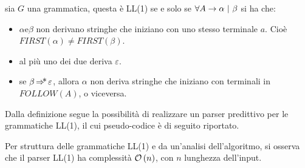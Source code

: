 \documentclass{subfiles}
\begin{document}
\begin{Definition*}
    sia $G$ una grammatica, questa è LL(1) se e solo se $\forall \Grammar{A}{\alpha}[\beta]$ si ha che:
    \begin{itemize}
        \item $\alpha \text{e} \beta$ non derivano stringhe che iniziano con uno stesso terminale $a$.
              Cioè $FIRST(\alpha) \neq FIRST(\beta)$.
        \item al più uno dei due deriva $\varepsilon$.
        \item se $\beta \operatorname{\Rightarrow\hspace{-5pt}*} \varepsilon$, allora $\alpha$ non deriva stringhe che iniziano con terminali in $FOLLOW(A)$, o viceversa.
    \end{itemize}
\end{Definition*}

Dalla definizione segue la possibilità di realizzare un parser predittivo per le grammatiche LL(1), il cui pseudo-codice è di seguito riportato.


\noindent Per struttura delle grammatiche LL(1) e da un'analisi dell'algoritmo, si osserva che il parser LL(1) ha complessità $\operatorname{\mathcal{O}} \left(n\right)$,
con $n$ lunghezza dell'input.
\end{document}
